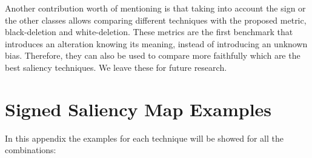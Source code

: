 \documentclass[preprint,12pt]{elsarticle}
\begin{document}
Another contribution worth of mentioning is that taking into account the sign or the other classes allows comparing different techniques with the proposed metric, black-deletion and white-deletion. These metrics are the first benchmark that introduces an alteration knowing its meaning, instead of introducing an unknown bias. Therefore, they can also be used to compare more faithfully which are the best saliency techniques. We leave these for future research.


 


\appendix

\section{Signed Saliency Map Examples}
\label{sec:signed saliency map examples}
In this appendix the examples for each technique will be showed for all the combinations:
\end{document}
